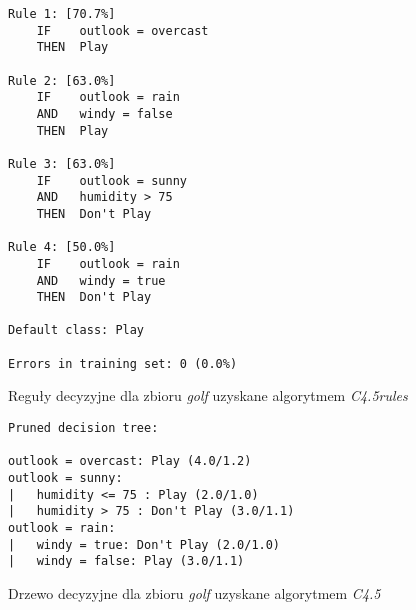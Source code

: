 \begin{figure}
\begin{verbatim}
Rule 1: [70.7%]
    IF    outlook = overcast
    THEN  Play

Rule 2: [63.0%]
    IF    outlook = rain
    AND   windy = false
    THEN  Play

Rule 3: [63.0%]
    IF    outlook = sunny
    AND   humidity > 75
    THEN  Don't Play

Rule 4: [50.0%]
    IF    outlook = rain
    AND   windy = true
    THEN  Don't Play

Default class: Play

Errors in training set: 0 (0.0%)
\end{verbatim}
\caption{Reguły decyzyjne dla zbioru \emph{golf} uzyskane algorytmem \emph{C4.5rules}}
\label{p2t1-rules}
\end{figure}

\begin{figure}
\begin{verbatim}
Pruned decision tree:

outlook = overcast: Play (4.0/1.2)
outlook = sunny:
|   humidity <= 75 : Play (2.0/1.0)
|   humidity > 75 : Don't Play (3.0/1.1)
outlook = rain:
|   windy = true: Don't Play (2.0/1.0)
|   windy = false: Play (3.0/1.1)
\end{verbatim}
\caption{Drzewo decyzyjne dla zbioru \emph{golf} uzyskane algorytmem \emph{C4.5}}
\label{p2t1-tree}
\end{figure}